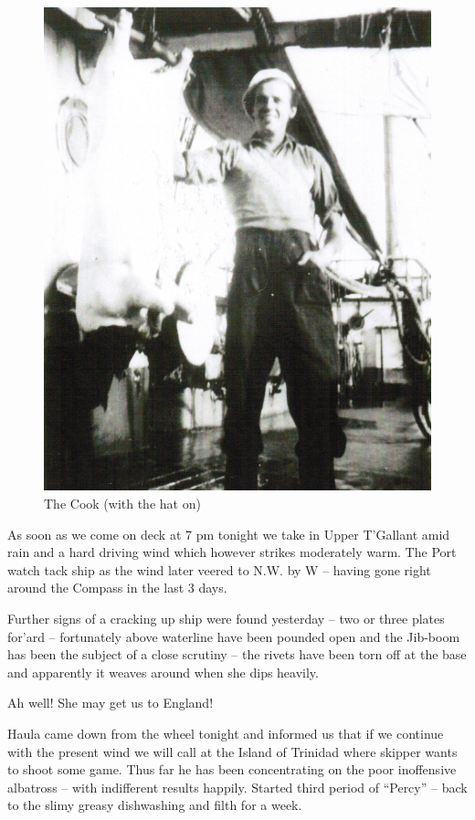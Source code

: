 \documentclass[
  11pt,
  msmallroyalvopaper
]{memoir}
\begin{document}
\begin{figure}
\centering
\includegraphics{./images/image017.png}
\caption{The Cook (with the hat on)}
\end{figure}

As soon as we come on deck at 7 pm tonight we take in Upper T'Gallant
amid rain and a hard driving wind which however strikes moderately warm.
The Port watch tack ship as the wind later veered to N.W. by W -- having
gone right around the Compass in the last 3 days.

Further signs of a cracking up ship were found yesterday -- two or three
plates for'ard -- fortunately above waterline have been pounded open and
the Jib-boom has been the subject of a close scrutiny -- the rivets have
been torn off at the base and apparently it weaves around when she dips
heavily.

Ah well! She may get us to England!

Haula came down from the wheel tonight and informed us that if we
continue with the present wind we will call at the Island of Trinidad
where skipper wants to shoot some game. Thus far he has been
concentrating on the poor inoffensive albatross -- with indifferent
results happily. Started third period of ``Percy'' -- back to the slimy
greasy dishwashing and filth for a week.
\end{document}
